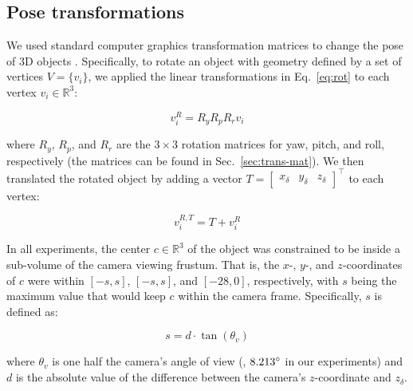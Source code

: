 \documentclass[10pt,twocolumn,letterpaper]{article}
\newcommand{\R}{\mathbb{R}}
\begin{document}
\subsection{Pose transformations}
\label{sec:transformations}

We used standard computer graphics transformation matrices to change the pose of 3D objects \cite{marschner2015fundamentals}.
Specifically, to rotate an object with geometry defined by a set of vertices $V = \{v_i\}$, we applied the linear transformations in Eq.~\ref{eq:rot} to each vertex $v_{i} \in \R^3$:

\begin{equation}
\label{eq:rot}
v_{i}^{R} = R_{y}R_{p}R_{r}v_{i}
\end{equation}

\noindent
where $R_{y}$, $R_{p}$, and $R_{r}$ are the $3\times 3$ rotation matrices for yaw, pitch, and roll, respectively (the matrices can be found in Sec.~\ref{sec:trans-mat}).
We then translated the rotated object by adding a vector $T = \begin{bmatrix} x_{\delta} & y_{\delta} & z_{\delta} \end{bmatrix}^\top$ to each vertex:

\begin{equation}
v_{i}^{R,T} = T + v_{i}^{R}
\end{equation}

In all experiments, the center $c \in \R^3$ of the object was constrained to be inside a sub-volume of the camera viewing frustum.
That is, the $x$-, $y$-, and $z$-coordinates of $c$ were within $[-s,s]$, $[-s,s]$, and $[-28,0]$, respectively, with $s$ being the maximum value that would keep $c$ within the camera frame.
Specifically, $s$ is defined as:

\begin{equation} \label{eq:max_trans}
s = d \cdot\tan(\theta_{v})
\end{equation}

\noindent
where $\theta_{v}$ is one half the camera's angle of view (\ie, $8.213\degree$ in our experiments) and $d$ is the absolute value of the difference between the camera's $z$-coordinate and $z_{\delta}$.

\end{document}

